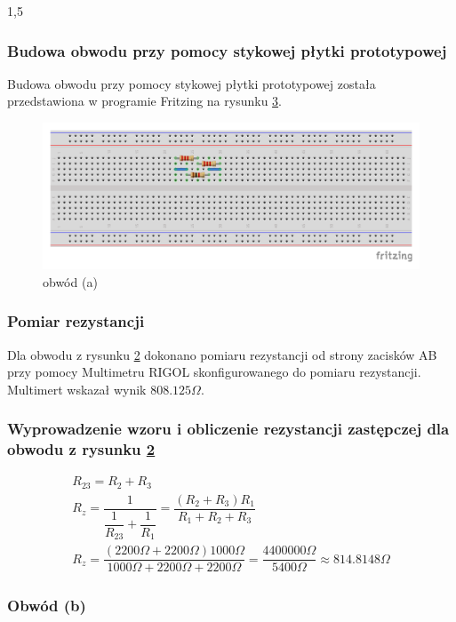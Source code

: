 \documentclass[polish,polish,a4paper]{article}
\begin{document}
\begin{spacing}{1,5}
		\subsubsection*{Budowa obwodu przy pomocy stykowej płytki prototypowej}
		Budowa obwodu przy pomocy stykowej płytki prototypowej została przedstawiona w programie Fritzing na rysunku \hyperref[fig:rys3]{3}.
		\begin{figure}[H]
			\centering
			\includegraphics[scale=0.9]{a_bb.pdf}
			\caption{obwód (a)}
			\label{fig:rys3}
		\end{figure}
		\subsubsection*{Pomiar rezystancji}
		Dla obwodu z rysunku \hyperref[eq:rys2]{2} dokonano pomiaru rezystancji od strony zacisków AB przy pomocy Multimetru RIGOL skonfigurowanego do pomiaru rezystancji. Multimert wskazał wynik $808.125 \Omega$.
		
		\subsubsection*{Wyprowadzenie wzoru i obliczenie rezystancji zastępczej  dla obwodu z rysunku \hyperref[eq:rys2]{2}}
		\begin{gather*}
		R_{23}=R_{2}+R_{3}  \\
		R_{z}=\dfrac{1}{\dfrac{1}{R_{23}} + \dfrac{1}{R_{1}}} = \dfrac{(R_{2}+R_{3})R_{1}}{R_{1}+R_{2}+R_{3}}\\
		R_{z}=\dfrac{(2200\Omega+2200\Omega)1000\Omega}{1000\Omega + 2200\Omega + 2200\Omega} = \dfrac{4400000\Omega}{5400\Omega} \approx 814.8148 \Omega
		\end{gather*}
		
		\subsubsection{Obwód (b)}
		

\end{spacing}
\end{document}
